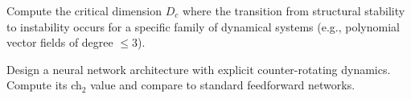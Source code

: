 \begin{exercise}[Hard]
Compute the critical dimension $D_c$ where the transition from structural stability to instability occurs for a specific family of dynamical systems (e.g., polynomial vector fields of degree $\leq 3$).
\end{exercise}

\begin{exercise}[Research]
Design a neural network architecture with explicit counter-rotating dynamics. Compute its ch$_2$ value and compare to standard feedforward networks.
\end{exercise}
